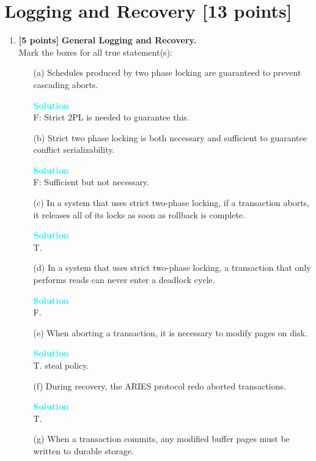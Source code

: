 \documentclass[10pt]{article}
\newenvironment{solution}
    { \begin{mdframed}[backgroundcolor=gray!10] \textcolor{cyan}{\textbf{Solution}} \\}
    {  \end{mdframed}}
\begin{document}
\section{Logging and Recovery \textbf{[13 points]}}
\begin{enumerate}
	\item \textbf{[5 points]} \textbf{General Logging and Recovery.} \\
	      Mark the boxes for all true statement(s):
	      \begin{itemize}
		      \item[(a)] Schedules produced by two phase locking are guaranteed to prevent cascading aborts.
		            \begin{solution}
			            F: Strict 2PL is needed to guarantee this.
		            \end{solution}
		      \item[(b)] Strict two phase locking is both necessary and sufficient to guarantee conflict serializability.
		            \begin{solution}
			            F: Sufficient but not necessary.
		            \end{solution}
		      \item[(c)] In a system that uses strict two-phase locking, if a transaction aborts, it releases all of its locks as soon as rollback is complete.
		            \begin{solution}
			            T.
		            \end{solution}
		      \item[(d)] In a system that uses strict two-phase locking, a transaction that only performs reads can never enter a deadlock cycle.
		            \begin{solution}
			            F.
		            \end{solution}
		      \item[(e)] When aborting a transaction, it is necessary to modify pages on disk.
		            \begin{solution}
			            T. steal policy.
		            \end{solution}
		      \item[(f)] During recovery, the ARIES protocol redo aborted transactions.
		            \begin{solution}
			            T.
		            \end{solution}
		      \item[(g)] When a transaction commits, any modified buffer pages must be written to durable storage.

\end{itemize}
\end{enumerate}
\end{document}
